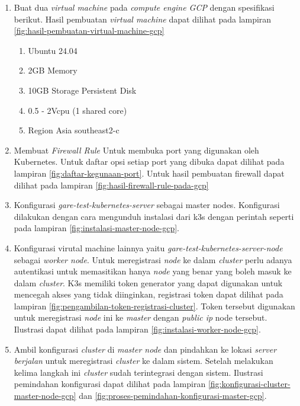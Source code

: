 \begin{enumerate}
    \item Buat dua \textit{virtual machine} pada \textit{compute engine GCP} dengan spesifikasi berikut. Hasil pembuatan \textit{virtual machine} dapat dilihat pada lampiran \ref{fig:hasil-pembuatan-virtual-machine-gcp}
          \begin{enumerate}
              \item Ubuntu 24.04
              \item 2GB Memory
              \item 10GB Storage Persistent Disk
              \item 0.5 - 2Vcpu (1 shared core)
              \item Region Asia southeast2-c
          \end{enumerate}
    \item Membuat \textit{Firewall Rule} Untuk membuka port yang digunakan oleh Kubernetes. Untuk daftar opsi setiap port yang dibuka dapat dilihat pada lampiran \ref{fig:daftar-kegunaan-port}. Untuk hasil pembuatan firewall dapat dilihat pada lampiran \ref{fig:hasil-firewall-rule-pada-gcp}
    \item Konfigurasi \textit{gare-test-kubernetes-server} sebagai master nodes. Konfigurasi dilakukan dengan cara mengunduh instalasi dari k3s dengan perintah seperti pada lampiran \ref{fig:instalasi-master-node-gcp}.
    \item Konfigurasi virutal machine lainnya yaitu \textit{gare-test-kubernetes-server-node} sebagai \textit{worker node}. Untuk meregistrasi \textit{node} ke dalam \textit{cluster} perlu adanya autentikasi untuk memasitikan hanya \textit{node} yang benar yang boleh masuk ke dalam \textit{cluster}. K3s memiliki token generator yang dapat digunakan untuk mencegah akses yang tidak diinginkan, registrasi token dapat dilihat pada lampiran \ref{fig:pengambilan-token-registrasi-cluster}. Token tersebut digunakan untuk meregistrasi \textit{node} ini ke \textit{master} dengan \textit{public ip} node tersebut. Ilustrasi dapat dilihat pada lampiran \ref{fig:instalasi-worker-node-gcp}.
    \item Ambil konfigurasi \textit{cluster} di \textit{master node} dan pindahkan ke lokasi \textit{server berjalan} untuk meregistrasi \textit{cluster} ke dalam sistem. Setelah melakukan kelima langkah ini \textit{cluster} sudah terintegrasi dengan sistem. Ilustrasi pemindahan konfigurasi dapat dilihat pada lampiran \ref{fig:konfigurasi-cluster-master-node-gcp} dan \ref{fig:proses-pemindahan-konfigurasi-master-gcp}.
\end{enumerate}


